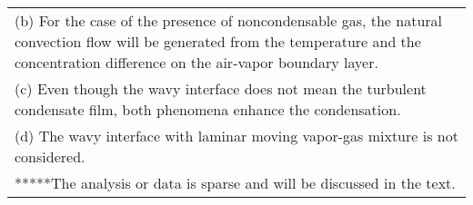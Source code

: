 \documentclass[12pt,fleqn]{report}
\begin{document}
{\begin{sidewaystable}
\begin{minipage}{9.0in}
\begin{center}
{\begin{tabular}{*{8}{l}}
\multicolumn{8}{l}{(b)  For the case of the presence of noncondensable gas, the natural convection flow will be generated from the temperature and the concentration difference on the air-vapor boundary layer.}\\ 
\multicolumn{8}{l}{(c)  Even though the wavy interface does not mean the turbulent condensate film, both phenomena enhance the condensation.}\\ 
\multicolumn{8}{l}{(d)  The wavy interface with laminar moving vapor-gas mixture is not considered.}\\ [4mm]
\multicolumn{8}{l}{*****The analysis or data is sparse and will be discussed in the text.}
\end{tabular}
}
\end{center}
\end{minipage}
\end{sidewaystable}
}
\end{document}
